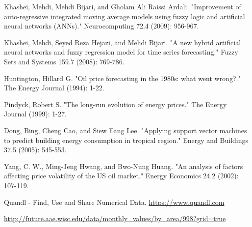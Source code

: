 \documentclass[runningheads]{llncs}
\begin{document}
\begin{thebibliography}{4}
Khashei, Mehdi, Mehdi Bijari, and Gholam Ali Raissi Ardali. "Improvement of auto-regressive integrated moving average models using fuzzy logic and artificial neural networks (ANNs)." Neurocomputing 72.4 (2009): 956-967.

Khashei, Mehdi, Seyed Reza Hejazi, and Mehdi Bijari. "A new hybrid artificial neural networks and fuzzy regression model for time series forecasting." Fuzzy Sets and Systems 159.7 (2008): 769-786.

 Huntington, Hillard G. "Oil price forecasting in the 1980s: what went wrong?." The Energy Journal (1994): 1-22.

 Pindyck, Robert S. "The long-run evolution of energy prices." The Energy Journal (1999): 1-27.

Dong, Bing, Cheng Cao, and Siew Eang Lee. "Applying support vector machines to predict building energy consumption in tropical region." Energy and Buildings 37.5 (2005): 545-553.

 Yang, C. W., Ming-Jeng Hwang, and Bwo-Nung Huang. "An analysis of factors affecting price volatility of the US oil market." Energy Economics 24.2 (2002): 107-119.

 Quandl - Find, Use and Share Numerical Data. \url{https://www.quandl.com}

\url{http://future.aae.wisc.edu/data/monthly_values/by_area/998?grid=true}

\end{thebibliography}
\end{document}
